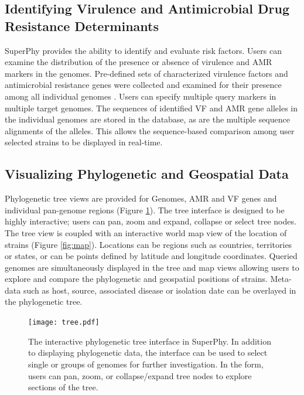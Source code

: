 \documentclass[a4paper,twoside]{article}
\begin{document}
\subsection{Identifying Virulence and Antimicrobial Drug Resistance Determinants}

SuperPhy provides the ability to identify and evaluate risk factors. Users can examine the distribution of the presence or absence of virulence and AMR markers in the genomes.  Pre-defined sets of characterized virulence factors and antimicrobial resistance genes were collected and examined for their presence among all individual genomes \cite{mcarthur2012card,chen2012vfdb,chen2005vfdb}. Users can specify multiple query markers in multiple target genomes. The sequences of identified VF and AMR gene alleles in the individual genomes are stored in the database, as are the multiple sequence alignments of the alleles. This allows the sequence-based comparison among user selected strains to be displayed in real-time.

\subsection{Visualizing Phylogenetic and Geospatial Data}

Phylogenetic tree views are provided for Genomes, AMR and VF genes and individual pan-genome regions (Figure \ref{fig:tree}). The tree interface is designed to be highly interactive; users can pan, zoom and expand, collapse or select tree nodes. The tree view is coupled with an interactive world map view of the location of strains (Figure \ref{fig:map}). Locations can be regions such as countries, territories or states, or can be points defined by latitude and longitude coordinates. Queried genomes are simultaneously displayed in the tree and map views allowing users to explore and compare the phylogenetic and geospatial positions of strains. Meta-data such as host, source, associated disease or isolation date can be overlayed in the phylogenetic tree.

\begin{figure}[!h]
  \centering
   {\texttt{[image: tree.pdf]}}
   \vspace{0.2cm}
  \caption{The interactive phylogenetic tree interface in SuperPhy. In addition to displaying phylogenetic data, the interface can be used to select single or groups of genomes for further investigation. In the form, users can pan, zoom, or collapse/expand tree nodes to explore sections of the tree.}
  \label{fig:tree}
\end{figure}
\end{document}
